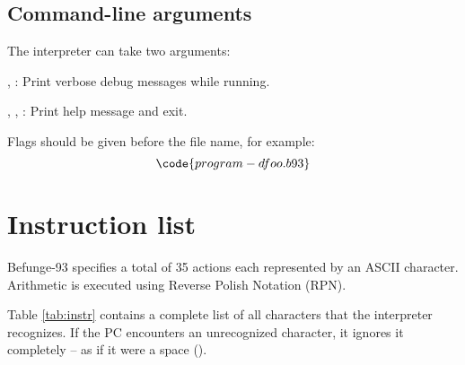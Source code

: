 \documentclass[12pt, a4paper]{article}
\begin{document}
\subsection{Command-line arguments}
\label{args}

The interpreter can take two arguments:

\vspace{6pt}
\noindent
{},  : Print verbose debug messages while running.

\vspace{6pt}
\noindent
{}, ,  : Print help message and exit.

Flags should be given before the file name, for example:
$$\code{program -d foo.b93}$$

\section{Instruction list}
\label{sec:instructions}

Befunge-93 specifies a total of 35 actions each represented by an ASCII character. Arithmetic is executed using Reverse Polish Notation (RPN).

Table \ref{tab:instr} contains a complete list of all characters that the interpreter recognizes. If the PC encounters an unrecognized character, it ignores it completely -- as if it were a space (\textvisiblespace).
\end{document}

